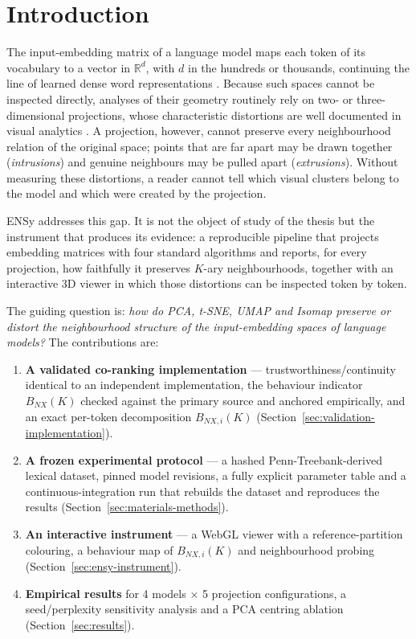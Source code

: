 \documentclass[conference,a4paper]{IEEEtran}
\providecommand{\tightlist}{\setlength{\itemsep}{0pt}\setlength{\parskip}{0pt}}
\begin{document}
\section{Introduction}\label{sec:introduction}

The input-embedding matrix of a language model maps each token of its
vocabulary to a vector in \(\mathbb{R}^d\), with \(d\) in the hundreds
or thousands, continuing the line of learned dense word representations
\cite{r2}. Because such spaces cannot be inspected directly, analyses of
their geometry routinely rely on two- or three-dimensional projections,
whose characteristic distortions are well documented in visual analytics
\cite{r3}. A projection, however, cannot preserve every neighbourhood
relation of the original space; points that are far apart may be drawn
together (\emph{intrusions}) and genuine neighbours may be pulled apart
(\emph{extrusions}). Without measuring these distortions, a reader
cannot tell which visual clusters belong to the model and which were
created by the projection.

ENSy addresses this gap. It is not the object of study of the thesis but
the instrument that produces its evidence: a reproducible pipeline that
projects embedding matrices with four standard algorithms and reports,
for every projection, how faithfully it preserves \(K\)-ary
neighbourhoods, together with an interactive 3D viewer in which those
distortions can be inspected token by token.

The guiding question is: \emph{how do PCA, t-SNE, UMAP and Isomap
preserve or distort the neighbourhood structure of the input-embedding
spaces of language models?} The contributions are:

\begin{enumerate}
\def\labelenumi{\arabic{enumi}.}
\tightlist
\item
  \textbf{A validated co-ranking implementation} ---
  trustworthiness/continuity identical to an independent implementation,
  the behaviour indicator \(B_{NX}(K)\) checked against the primary
  source and anchored empirically, and an exact per-token decomposition
  \(B_{NX,i}(K)\) (Section~\ref{sec:validation-implementation}).
\item
  \textbf{A frozen experimental protocol} --- a hashed
  Penn-Treebank-derived lexical dataset, pinned model revisions, a fully
  explicit parameter table and a continuous-integration run that
  rebuilds the dataset and reproduces the results (Section~\ref{sec:materials-methods}).
\item
  \textbf{An interactive instrument} --- a WebGL viewer with a
  reference-partition colouring, a behaviour map of \(B_{NX,i}(K)\) and
  neighbourhood probing (Section~\ref{sec:ensy-instrument}).
\item
  \textbf{Empirical results} for 4 models × 5 projection configurations,
  a seed/perplexity sensitivity analysis and a PCA centring ablation
  (Section~\ref{sec:results}).
\end{enumerate}
\end{document}
